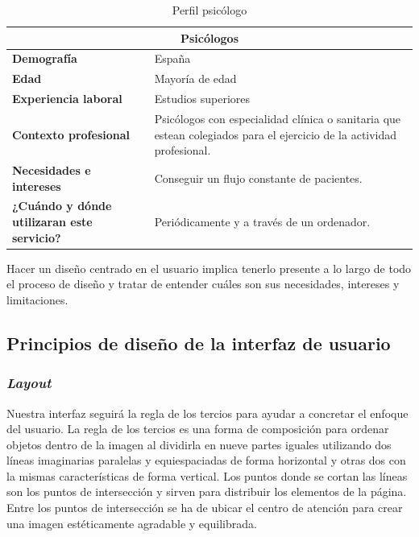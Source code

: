 \begin{table}[htpb]
\centering
\begin{tabular}{|l|l|}
\hline
\multicolumn{2}{|c|}{\textbf{Psicólogos}}                                                                                                                                 \\ \hline
\textbf{Demografía}                                & España                                                                                                               \\ \hline
\textbf{Edad}                                      & Mayoría de edad                                                                                                      \\ \hline
\textbf{Experiencia laboral}                       & Estudios superiores                                                                                                  \\ \hline
\textbf{Contexto profesional}                      & Psicólogos con especialidad clínica o sanitaria que estean colegiados para el ejercicio de la actividad profesional. \\ \hline
\textbf{Necesidades e intereses}                   & Conseguir un flujo constante de pacientes.                                                                           \\ \hline
\textbf{¿Cuándo y dónde utilizaran este servicio?} & Periódicamente y a través de un ordenador.                                                                           \\ \hline
\end{tabular}
\caption{Perfil psicólogo}
\label{perf_psic}
\end{table}


Hacer un diseño centrado en el usuario implica tenerlo presente a lo largo de todo el proceso de diseño y tratar de entender cuáles son sus necesidades, intereses y limitaciones.


\subsection{Principios de diseño de la interfaz de usuario}

\subsubsection{\textit{Layout}}
Nuestra interfaz seguirá la regla de los tercios para ayudar a concretar el enfoque del usuario. La regla de los tercios es una forma de composición para ordenar objetos dentro de la imagen al dividirla en nueve partes iguales utilizando dos líneas imaginarias paralelas y equiespaciadas de forma horizontal y otras dos con la mismas características de forma vertical. Los puntos donde se cortan las líneas son los puntos de intersección y sirven para distribuir los elementos de la página. Entre los puntos de intersección se ha de ubicar el centro de atención para crear una imagen estéticamente agradable y equilibrada\cite{georgefield1845}.


